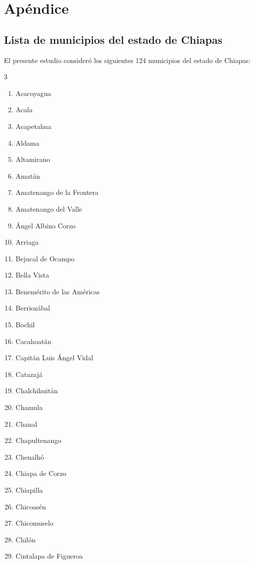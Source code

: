 \documentclass[
  spanish,
  us-letterpaper,
]{scrreprt}
\numberwithin{equation}{section}
\begin{document}
\cleardoublepage
{}
{}
\appendix

\chapter{Apéndice}\label{apuxe9ndice}

\section{Lista de municipios del estado de
Chiapas}\label{sec-apendice-municipios}

El presente estudio consideró los siguientes 124 municipios del estado
de Chiapas:

\begin{multicols}{3}
\begin{enumerate}
\item Acacoyagua
\item Acala
\item Acapetahua
\item Aldama
\item Altamirano
\item Amatán
\item Amatenango de la Frontera
\item Amatenango del Valle
\item Ángel Albino Corzo
\item Arriaga
\item Bejucal de Ocampo
\item Bella Vista
\item Benemérito de las Américas
\item Berriozábal
\item Bochil
\item Cacahoatán
\item Capitán Luis Ángel Vidal
\item Catazajá
\item Chalchihuitán
\item Chamula
\item Chanal
\item Chapultenango
\item Chenalhó
\item Chiapa de Corzo
\item Chiapilla
\item Chicoasén
\item Chicomuselo
\item Chilón
\item Cintalapa de Figueroa

\end{enumerate}
\end{multicols}
\end{document}
